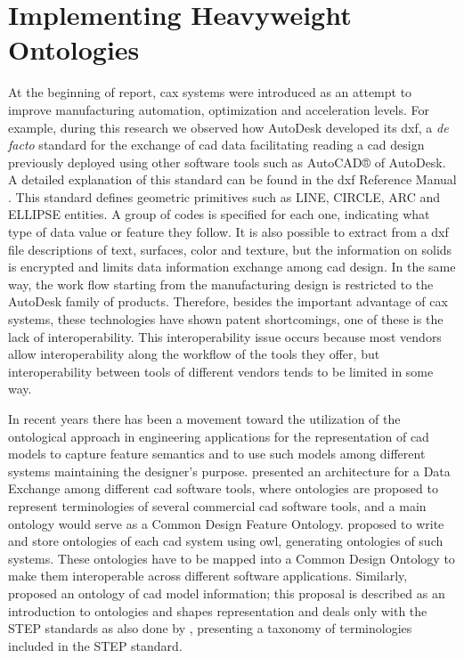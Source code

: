 \section{Implementing Heavyweight Ontologies}\label{section4.4}


At the beginning of report, \gls{cax} systems were introduced as an attempt to improve manufacturing automation, optimization and acceleration levels. For example, during this research we observed how AutoDesk developed its \gls{dxf}, a \textit{de facto} standard for the exchange of \gls{cad} data facilitating reading a \gls{cad} design previously deployed using other software tools such as AutoCAD® of AutoDesk. A detailed explanation of this standard can be found in the \gls{dxf} Reference Manual \cite{autodesk_dxf_2009}.  This standard defines geometric primitives such as LINE, CIRCLE, ARC and ELLIPSE entities. A group of codes is specified for each one, indicating what type of data value or feature they follow. It is also possible to extract from a \gls{dxf} file descriptions of text, surfaces, color and texture, but the information on solids is encrypted \cite{choi_exchange_2003} and limits data information exchange among \gls{cad} design. In the same way, the work flow starting from the manufacturing design is restricted to the AutoDesk family of products. Therefore, besides the important advantage of \gls{cax} systems, these technologies have shown patent shortcomings, one of these is the lack of interoperability.  This interoperability issue occurs because most vendors allow interoperability along the workflow of the tools they offer, but interoperability between tools of different vendors tends to be limited in some way.


In recent years there has been a movement toward the utilization of the ontological approach in engineering applications for the representation of  \gls{cad} models to capture feature semantics and to use such models among different systems maintaining the designer’s purpose. \cite{abdul-ghafour_common_2007} presented an architecture for a Data Exchange among different \gls{cad} software tools, where ontologies are proposed to represent terminologies of several commercial \gls{cad} software tools, and a main ontology would serve as a Common Design Feature Ontology. \cite{abdul-ghafour_common_2007} proposed to write and store ontologies of each \gls{cad} system using \gls{owl}, generating ontologies of such systems.   These ontologies have to be mapped into a Common Design Ontology to make them interoperable across different software applications. Similarly, \cite{andersen_building_2007} proposed an ontology of \gls{cad} model information; this proposal is described as an introduction to ontologies and shapes representation and deals only with the STEP standards as also done by \cite{abdul-ghafour_common_2007}, presenting a taxonomy of terminologies included in the STEP standard. 

